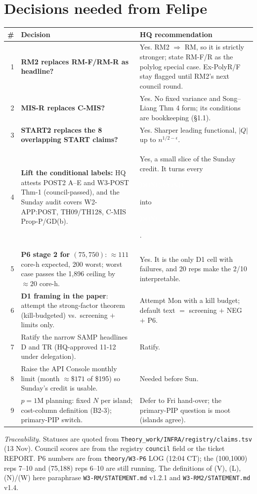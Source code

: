 \documentclass[11pt,a4paper]{article}
\newcommand{\badge}[2]{\colorbox{#1}{\textcolor{white}{\sffamily\scriptsize\bfseries\strut #2}}}
\newcommand{\DONE}{\badge{done}{DONE}}
\newcommand{\DONEC}{\badge{cond}{DONE-COND}}
\newcommand{\cid}[1]{\texttt{\small #1}}
\theoremstyle{definition}
\begin{document}
\section{Decisions needed from Felipe}
{\small
\renewcommand{\arraystretch}{1.15}
\begin{tabularx}{\linewidth}{@{}r X X@{}}
\toprule
\# & Decision & HQ recommendation\\
\midrule
1 & \textbf{RM2 replaces RM-F/RM-R as headline?} & Yes. RM2 $\Rightarrow$ RM, so it is strictly stronger; state RM-F/R as the polylog special case. Ex-PolyR/F stay flagged until RM2's next council round.\\
2 & \textbf{MIS-R replaces C-MIS?} & Yes. No fixed variance and Song--Liang Thm 4 form; its conditions are bookkeeping (\S1.1).\\
3 & \textbf{START2 replaces the 8 overlapping START claims?} & Yes. Sharper leading functional, $|Q|$ up to $n^{1/2-\epsilon}$.\\
4 & \textbf{Lift the conditional labels:} HQ attests POST2 A--E and W3-POST Thm-1 (council-passed), and the Sunday audit covers W2-APP:POST, TH09/TH128, C-MIS Prop-P/GD(b). & Yes, a small slice of the Sunday credit. It turns every \DONEC{} into \DONE.\\
5 & \textbf{P6 stage 2 for $(75,750)$}: $\approx111$ core-h expected, 200 worst; worst case passes the 1,896 ceiling by $\approx20$ core-h. & Yes. It is the only D1 cell with failures, and 20 reps make the 2/10 interpretable.\\
6 & \textbf{D1 framing in the paper}: attempt the strong-factor theorem (kill-budgeted) vs.\ screening $+$ limits only. & Attempt Mon with a kill budget; default text $=$ screening $+$ NEG $+$ P6.\\
7 & Ratify the narrow SAMP headlines D and TR (HQ-approved 11-12 under delegation). & Ratify.\\
8 & Raise the API Console monthly limit (month $\approx\$171$ of \$195) so Sunday's credit is usable. & Needed before Sun.\\
9 & $p=1$M planning: fixed $N$ per island; cost-column definition (B2-3); primary-PIP switch. & Defer to Fri hand-over; the primary-PIP question is moot (islands agree).\\
\bottomrule
\end{tabularx}}

\vfill
{\footnotesize\textit{Traceability.} Statuses are quoted from \cid{Theory\_work/INFRA/registry/claims.tsv} (13 Nov). Council
scores are from the registry \texttt{council} field or the ticket REPORT. P6 numbers are from \cid{theory/W3-P6} LOG
(12:04 CT); the (100,1000) reps 7--10 and (75,188) reps 6--10 are still running. The definitions of (V), (L), (N)/(W) here
paraphrase \cid{W3-RM/STATEMENT.md} v1.2.1 and \cid{W3-RM2/STATEMENT.md} v1.4.}
\end{document}
